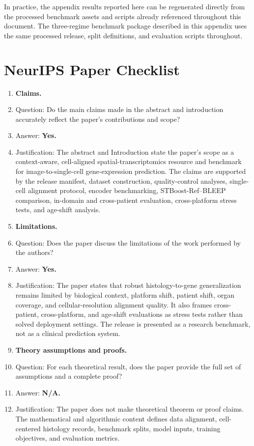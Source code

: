 \documentclass{article}
\begin{document}
In practice, the appendix results reported here can be regenerated directly from the processed benchmark assets and scripts already referenced throughout this document. The three-regime benchmark package described in this appendix uses the same processed release, split definitions, and evaluation scripts throughout.


\clearpage
\section*{NeurIPS Paper Checklist}

\begin{enumerate}[leftmargin=*]

\item \textbf{Claims.}
    \item[] Question: Do the main claims made in the abstract and introduction accurately reflect the paper's contributions and scope?
    \item[] Answer: \textbf{Yes.}
    \item[] Justification: The abstract and Introduction state the paper's scope as a context-aware, cell-aligned spatial-transcriptomics resource and benchmark for image-to-single-cell gene-expression prediction. The claims are supported by the release manifest, dataset construction, quality-control analyses, single-cell alignment protocol, encoder benchmarking, STBoost-Ref--BLEEP comparison, in-domain and cross-patient evaluation, cross-platform stress tests, and age-shift analysis.

\item \textbf{Limitations.}
    \item[] Question: Does the paper discuss the limitations of the work performed by the authors?
    \item[] Answer: \textbf{Yes.}
    \item[] Justification: The paper states that robust histology-to-gene generalization remains limited by biological context, platform shift, patient shift, organ coverage, and cellular-resolution alignment quality. It also frames cross-patient, cross-platform, and age-shift evaluations as stress tests rather than solved deployment settings. The release is presented as a research benchmark, not as a clinical prediction system.

\item \textbf{Theory assumptions and proofs.}
    \item[] Question: For each theoretical result, does the paper provide the full set of assumptions and a complete proof?
    \item[] Answer: \textbf{N/A.}
    \item[] Justification: The paper does not make theoretical theorem or proof claims. The mathematical and algorithmic content defines data alignment, cell-centered histology records, benchmark splits, model inputs, training objectives, and evaluation metrics.


\end{enumerate}
\end{document}
